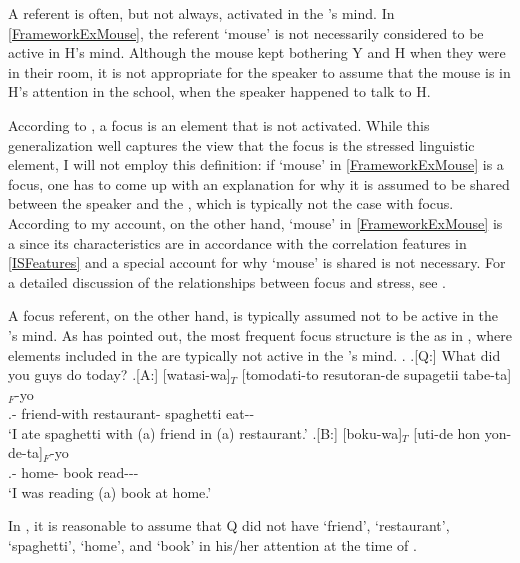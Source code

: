 A  referent is often, but not always, activated in the 's mind.
In \ref{FrameworkExMouse},
the referent `mouse' is not necessarily considered to be active in H's mind.
Although the mouse kept bothering Y and H when they were in their room,
it is not appropriate for the speaker to assume that the mouse is in H's attention in the school, when the speaker happened to talk to H.

According to ,
a focus is an element that is not activated.
While this generalization well captures the view that the focus is the stressed linguistic element,
I will not employ this definition:
if  `mouse' in \ref{FrameworkExMouse} is a focus,
one has to come up with an explanation for why it is assumed to be shared between the speaker and the ,
which is typically not the case with focus.
According to my account, on the other hand,
 `mouse' in \ref{FrameworkExMouse} is a  since its characteristics are in accordance with the  correlation features in \ref{ISFeatures}
and a special account for why  `mouse' is shared is not necessary.
For a detailed discussion of the relationships between focus and stress,
see .

A focus referent, on the other hand, is typically assumed not to be active in the 's mind.
As  has pointed out,
the most frequent focus structure is the   as in \Next[A,B],
where elements included in the  are typically not active in the 's mind.
\ex.\label{tomodati} \a.[Q:] What did you guys do today?
	\bg.[A:] [watasi-wa]$_{T}$ [tomodati-to resutoran-de supagetii tabe-ta]$_{F}$-yo \\
			.- friend-with restaurant- spaghetti eat-- \\
			`I ate spaghetti with (a) friend in (a) restaurant.'
	\bg.[B:] [boku-wa]$_{T}$ [uti-de hon yon-de-ta]$_{F}$-yo \\
			.- home- book read--- \\
			`I was reading (a) book at home.'

In \Last,
it is reasonable to assume that
Q did not have `friend', `restaurant', `spaghetti', `home', and `book' in his/her attention at the time of  \Last[Q].

